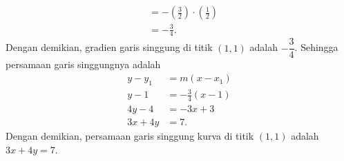 \documentclass[11pt,openany,a4paper]{article}
\begin{document}
\begin{enumerate}
\begin{align*}
                                                   & = -\left(\frac{3}{2}\right) \cdot \left(\frac{1}{2}\right)                                    \\
                                                   & = -\frac{3}{4}.
          \end{align*}
          Dengan demikian, gradien garis singgung di titik $(1,1)$ adalah $-\dfrac{3}{4}$. Sehingga persamaan garis singgungnya adalah
          \begin{align*}
              y - y_1 & = m(x - x_1)          \\
              y - 1   & = -\frac{3}{4}(x - 1) \\
              4y - 4  & = -3x + 3             \\
              3x + 4y & = 7.
          \end{align*}
          Dengan demikian, persamaan garis singgung kurva di titik $(1,1)$ adalah $3x + 4y = 7$.

\end{enumerate}
\end{document}
